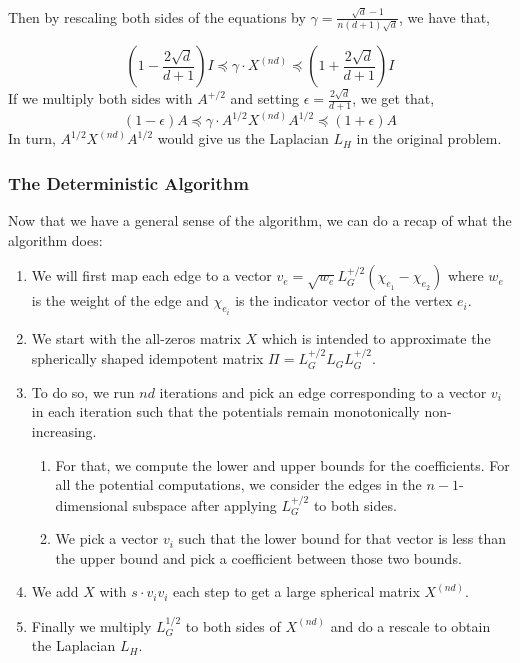 \documentclass[
  letterpaper,
  DIV=11,
  numbers=noendperiod]{scrartcl}
\providecommand{\tightlist}{%
  \setlength{\itemsep}{0pt}\setlength{\parskip}{0pt}}\usepackage{longtable,booktabs,array}
\theoremstyle{plain}
\theoremstyle{plain}
\theoremstyle{plain}
\theoremstyle{definition}
\theoremstyle{plain}
\theoremstyle{remark}
\begin{document}
Then by rescaling both sides of the equations by
\(\gamma = \frac{\sqrt{d} - 1}{n(d+1)\sqrt{d}}\), we have that,

\begin{equation} \tag{3} \label{eq:rescaling}
(1 - \frac{2\sqrt{d}}{d+1}) I \preceq \gamma \cdot X^{(nd)} \preceq (1 + \frac{2\sqrt{d}}{d+1}) I
\end{equation} If we multiply both sides with \(A^{+/2}\) and setting
\(\epsilon = \frac{2\sqrt{d}}{d + 1}\), we get that, \[
(1 - \epsilon) A \preceq \gamma \cdot A^{1/2} X^{(nd)} A^{1/2} \preceq (1 + \epsilon) A
\] In turn, \(A^{1/2} X^{(nd)} A^{1/2}\) would give us the Laplacian
\(L_H\) in the original problem.

\hypertarget{the-deterministic-algorithm}{%
\subsubsection{The Deterministic
Algorithm}\label{the-deterministic-algorithm}}

Now that we have a general sense of the algorithm, we can do a recap of
what the algorithm does:

\begin{enumerate}
\def\labelenumi{\arabic{enumi}.}
\item
  We will first map each edge to a vector
  \(v_e = \sqrt{w_e} L_G^{+/2} (\chi_{e_1} - \chi_{e_2})\) where \(w_e\)
  is the weight of the edge and \(\chi_{e_i}\) is the indicator vector
  of the vertex \(e_i\).
\item
  We start with the all-zeros matrix \(X\) which is intended to
  approximate the spherically shaped idempotent matrix
  \(\Pi = L_G^{+/2} L_G L_G^{+/2}\).
\item
  To do so, we run \(nd\) iterations and pick an edge corresponding to a
  vector \(v_i\) in each iteration such that the potentials remain
  monotonically non-increasing.

  \begin{enumerate}
  \def\labelenumii{\roman{enumii}.}
  \tightlist
  \item
    For that, we compute the lower and upper bounds for the
    coefficients. For all the potential computations, we consider the
    edges in the \(n-1\)-dimensional subspace after applying
    \(L_G^{+/2}\) to both sides.
  \item
    We pick a vector \(v_i\) such that the lower bound for that vector
    is less than the upper bound and pick a coefficient between those
    two bounds.
  \end{enumerate}
\item
  We add \(X\) with \(s \cdot v_i v_i\) each step to get a large
  spherical matrix \(X^{(nd)}\).
\item
  Finally we multiply \(L_G^{1/2}\) to both sides of \(X^{(nd)}\) and do
  a rescale to obtain the Laplacian \(L_H\).
\end{enumerate}
\end{document}
